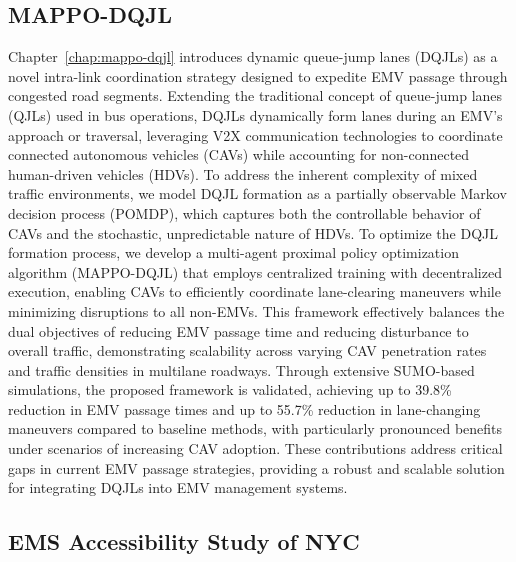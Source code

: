 \subsection{MAPPO-DQJL}

Chapter~\ref{chap:mappo-dqjl} introduces dynamic queue-jump lanes (DQJLs) as a novel intra-link coordination strategy designed to expedite EMV passage through congested road segments. Extending the traditional concept of queue-jump lanes (QJLs) used in bus operations, DQJLs dynamically form lanes during an EMV's approach or traversal, leveraging V2X communication technologies to coordinate connected autonomous vehicles (CAVs) while accounting for non-connected human-driven vehicles (HDVs). To address the inherent complexity of mixed traffic environments, we model DQJL formation as a partially observable Markov decision process (POMDP), which captures both the controllable behavior of CAVs and the stochastic, unpredictable nature of HDVs. To optimize the DQJL formation process, we develop a multi-agent proximal policy optimization algorithm (MAPPO-DQJL) that employs centralized training with decentralized execution, enabling CAVs to efficiently coordinate lane-clearing maneuvers while minimizing disruptions to all non-EMVs. This framework effectively balances the dual objectives of reducing EMV passage time and reducing disturbance to overall traffic, demonstrating scalability across varying CAV penetration rates and traffic densities in multilane roadways. Through extensive SUMO-based simulations, the proposed framework is validated, achieving up to 39.8\% reduction in EMV passage times and up to 55.7\% reduction in lane-changing maneuvers compared to baseline methods, with particularly pronounced benefits under scenarios of increasing CAV adoption. These contributions address critical gaps in current EMV passage strategies, providing a robust and scalable solution for integrating DQJLs into EMV management systems.

\subsection{EMS Accessibility Study of NYC}

